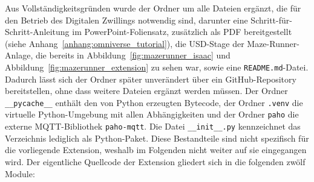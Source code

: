 Aus Vollständigkeitsgründen wurde der Ordner um alle Dateien ergänzt, die für den Betrieb des Digitalen Zwillings notwendig sind, darunter eine Schritt-für-Schritt-Anleitung im PowerPoint-Foliensatz, zusätzlich als PDF bereitgestellt (siehe Anhang~\ref{anhang:omniverse_tutorial}), die USD-Stage der Maze-Runner-Anlage, die bereits in Abbildung~\ref{fig:mazerunner_isaac} und Abbildung~\ref{fig:mazerunner_extension} zu sehen war, sowie eine \texttt{README.md}-Datei.
Dadurch lässt sich der Ordner später unverändert über ein GitHub-Repository bereitstellen, ohne dass weitere Dateien ergänzt werden müssen.
Der Ordner \texttt{\_\_pycache\_\_} enthält den von Python erzeugten Bytecode, der Ordner \texttt{.venv} die virtuelle Python-Umgebung mit allen Abhängigkeiten und der Ordner \texttt{paho} die externe MQTT-Bibliothek \texttt{paho-mqtt}.
Die Datei \texttt{\_\_init\_\_.py} kennzeichnet das Verzeichnis lediglich als Python-Paket.
Diese Bestandteile sind nicht spezifisch für die vorliegende Extension, weshalb im Folgenden nicht weiter auf sie eingegangen wird.
Der eigentliche Quellcode der Extension gliedert sich in die folgenden zwölf Module:

